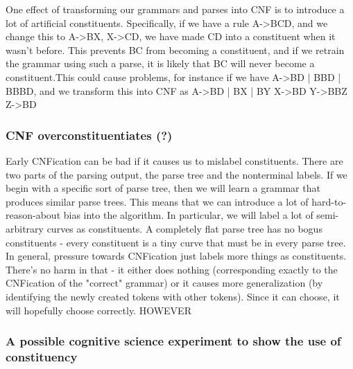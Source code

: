 \documentclass{article}
\begin{document}
One effect of transforming our grammars and parses into CNF is to
introduce a lot of artificial constituents. Specifically, if we have a
rule A->BCD, and we change this to A->BX, X->CD, we have made CD into a
constituent when it wasn't before. This prevents BC from becoming a
constituent, and if we retrain the grammar using such a parse, it is
likely that BC will never become a constituent.This could cause
problems, for instance if we have A->BD | BBD | BBBD, and we transform
this into CNF as
A->BD | BX | BY
X->BD
Y->BBZ
Z->BD

\subsubsection{CNF overconstituentiates (?)}
Early CNFication can be bad if it causes us to mislabel constituents.
There are two parts of the parsing output, the parse tree and the
nonterminal labels. If we begin with a specific sort of parse tree,
then we will learn a grammar that produces similar parse trees. This
means that we can introduce a lot of hard-to-reason-about bias into
the algorithm. In particular, we will label a lot of semi-arbitrary
curves as constituents. A completely flat parse tree has no bogus
constituents - every constituent is a tiny curve that must be in every
parse tree. In general, pressure towards CNFication just labels more
things as constituents. There's no harm in that - it either does
nothing (corresponding exactly to the CNFication of the "correct"
grammar) or it causes more generalization (by identifying the newly
created tokens with other tokens). Since it can choose, it will
hopefully choose correctly.  HOWEVER


\subsubsection{A possible cognitive science experiment to show the use of constituency}



\end{document}
